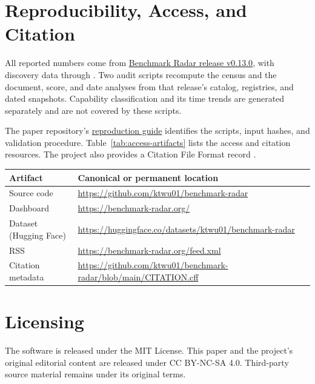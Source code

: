 \documentclass[11pt]{article}
\newcommand{\datacutoff}{\ReportDataCutoff}
\begin{document}
\section{Reproducibility, Access, and Citation}
\label{app:reproducibility}

All reported numbers come from \href{https://github.com/ktwu01/benchmark-radar/releases/tag/v0.13.0}{Benchmark Radar release v0.13.0}, with discovery data through \datacutoff{}. Two audit scripts recompute the census and the document, score, and date analyses from that release's catalog, registries, and dated snapshots. Capability classification and its time trends are generated separately and are not covered by these scripts.

The paper repository's \href{https://github.com/ktwu01/benchmark-radar-paper/blob/44f4146b1f67ba82b9af71d93d80b249b8887e93/README.md\#reproduce-the-papers-numbers}{reproduction guide} identifies the scripts, input hashes, and validation procedure. Table~\ref{tab:access-artifacts} lists the access and citation resources. The project also provides a Citation File Format record \citep{smith2016,katz2021,cff}.

\begin{center}
\centering
\small
\begin{tabularx}{\textwidth}{L{0.28\textwidth}Y}
\toprule
\textbf{Artifact} & \textbf{Canonical or permanent location}\\
\midrule
Source code & \url{https://github.com/ktwu01/benchmark-radar}\\
Dashboard & \url{https://benchmark-radar.org/}\\
Dataset (Hugging Face) & \url{https://huggingface.co/datasets/ktwu01/benchmark-radar}\\
RSS & \url{https://benchmark-radar.org/feed.xml}\\
Citation metadata & \url{https://github.com/ktwu01/benchmark-radar/blob/main/CITATION.cff}\\
\bottomrule
\end{tabularx}
\label{tab:access-artifacts}
\end{center}

\section*{Licensing}
The software is released under the MIT License. This paper and the project's original editorial content are released under CC BY-NC-SA 4.0. Third-party source material remains under its original terms.
\end{document}
